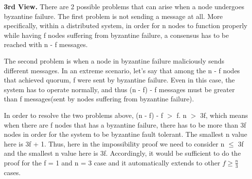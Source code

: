 \documentclass{article}
\begin{document}
\textbf{3rd View.} There are 2 possible problems that can arise when a node undergoes byzantine failure. The first problem is not sending a message at all. More specifically, within a distributed system, in order for n nodes to function properly while having f nodes suffering from byzantine failure, a consensus has to be reached with n - f messages. 

The second problem is when a node in byzantine failure maliciously sends different messages. In an extreme scenario, let’s say that among the n - f nodes that achieved quorum, f were sent by byzantine failure. Even in this case, the system has to operate normally, and thus (n - f) - f messages must be greater than f messages(sent by nodes suffering from byzantine failure).

In order to resolve the two problems above, (n - f) - f $ > $ f. n $>$ 3f, which means when there are f nodes that has a byzantine failure, there has to be more than 3f nodes in order for the system to be byzantine fault tolerant. The smallest n value here is 3f + 1. Thus, here in the impossibility proof we need to consider n $\leq$ 3f and the smallest n value here is 3f. Accordingly, it would be sufficient to do the proof for the f = 1 and n = 3 case and it automatically extends to other $ f\ge \frac{n}{3}$ cases.
\end{document}

